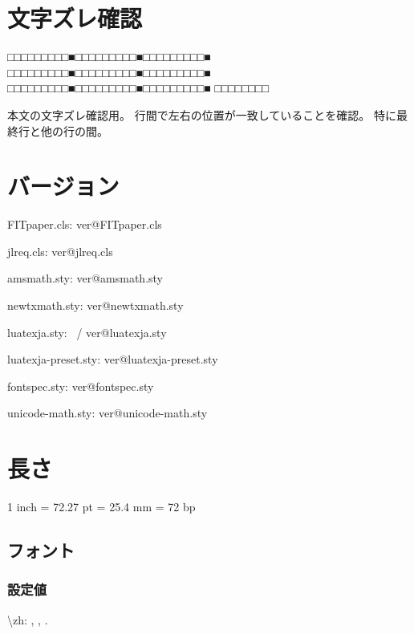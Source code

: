 \documentclass{FITpaper}
\begin{document}
\maketitle

\section{文字ズレ確認}

□□□□□□□□□■□□□□□□□□□■□□□□□□□□□■
□□□□□□□□□■□□□□□□□□□■□□□□□□□□□■
□□□□□□□□□■□□□□□□□□□■□□□□□□□□□■
□□□□□□□□

本文の文字ズレ確認用。
行間で左右の位置が一致していることを確認。
特に最終行と他の行の間。

\section{バージョン}

\makeatletter
FITpaper.cls: \csname ver@FITpaper.cls\endcsname\par
jlreq.cls: \csname ver@jlreq.cls\endcsname\par
amsmath.sty: \csname ver@amsmath.sty\endcsname\par
\ifx\luatexversion\@undefined
newtxmath.sty: \csname ver@newtxmath.sty\endcsname\par
\else
luatexja.sty: \LuaTeXjaversion ~/ \csname ver@luatexja.sty\endcsname\par
luatexja-preset.sty: \csname ver@luatexja-preset.sty\endcsname\par
fontspec.sty: \csname ver@fontspec.sty\endcsname\par
unicode-math.sty: \csname ver@unicode-math.sty\endcsname\par
\fi
\makeatother

\section{長さ}

1 inch = 72.27 pt = 25.4 mm = 72 bp

\subsection{フォント}

\subsubsection{設定値}

\newlength{\myzh}
\setlength{\myzh}{1\zh}
\textbackslash zh:
\prntlen{\myzh},
\prntlen{\myzh},
\prntlen{\myzh}.
\end{document}
